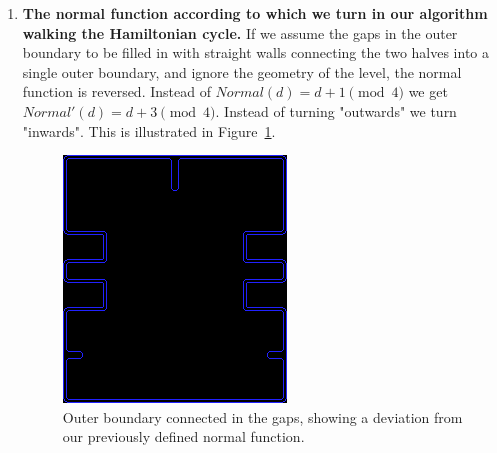 \begin{enumerate}
\item {\bf The normal function according to which we turn in our algorithm walking the Hamiltonian cycle.} If we assume the gaps in the outer boundary to be filled in with straight walls connecting the two halves into a single outer boundary, and ignore the geometry of the level, the normal function is reversed. Instead of $Normal(d)=d+1\pmod{4}$ we get $Normal'(d)=d+3\pmod{4}$. Instead of turning "outwards" we turn "inwards". This is illustrated in Figure~\ref{ConnectedOuterBoundary}. 
\begin{figure}[H]
\centering
\includegraphics[width=0.6\linewidth]{Image-13.png}
\caption {Outer boundary connected in the gaps, showing a deviation from our previously defined normal function.\autocite{pittman_pac-man_2009}}\label{ConnectedOuterBoundary}
\end{figure}
\end{enumerate}
